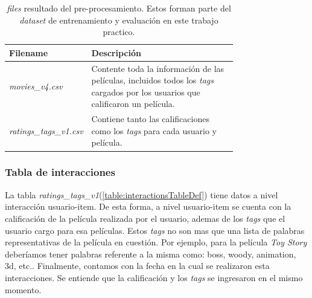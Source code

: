 \documentclass[11pt,a4paper,twoside]{thesis}
\begin{document}
\begin{table}[!htb]
	\centering
	\footnotesize
	\begin{tabular}{l | p{0.75\linewidth}}
		\hline
		Filename                       & Descripción                                                                                                                             \\
		\hline
		\textit{movies\_v4.csv}        & Contente toda la información de las películas, incluidos todos los \textit{tags} cargados por los usuarios que calificaron un película. \\
		\textit{ratings\_tags\_v1.csv} & Contiene tanto las calificaciones como los \textit{tags} para cada usuario y película.                                                  \\
		\hline
	\end{tabular}
	\caption{
		\textit{files} resultado del pre-procesamiento. Estos forman parte del \textit{dataset} de entrenamiento y evaluación en este trabajo practico.
	}
	\label{table:tableFiles}
\end{table}

\subsubsection{Tabla de interacciones}

La tabla \textit{ratings\_tags\_v1}(\ref{table:interactionsTableDef}) tiene
datos a nivel interacción usuario-item. De esta forma, a nivel usuario-item se
cuenta con la calificación de la película realizada por el usuario, ademas de
los \textit{tags} que el usuario cargo para esa películas. Estos \textit{tags}
no son mas que una lista de palabras representativas de la película en
cuestión. Por ejemplo, para la película \textit{Toy Story} deberíamos tener
palabras referente a la misma como: boss, woody, animation, 3d, etc..
Finalmente, contamos con la fecha en la cual se realizaron esta interacciones.
Se entiende que la calificación y los \textit{tags} se ingresaron en el mismo
momento.
\end{document}

